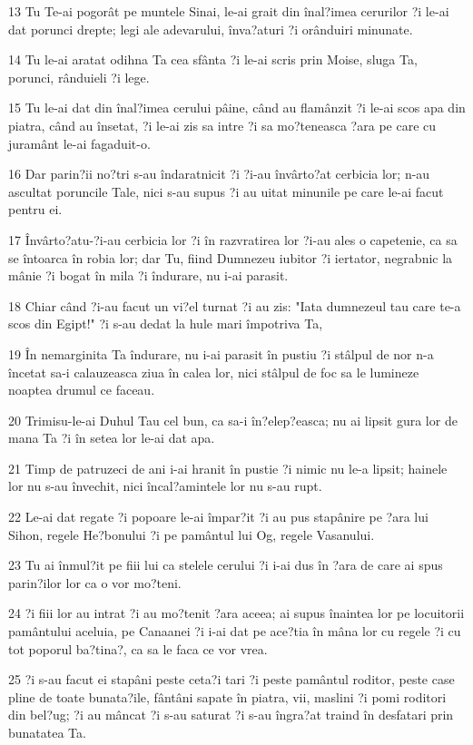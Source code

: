 \par 13 Tu Te-ai pogorât pe muntele Sinai, le-ai grait din înal?imea cerurilor ?i le-ai dat porunci drepte; legi ale adevarului, înva?aturi ?i orânduiri minunate.
\par 14 Tu le-ai aratat odihna Ta cea sfânta ?i le-ai scris prin Moise, sluga Ta, porunci, rânduieli ?i lege.
\par 15 Tu le-ai dat din înal?imea cerului pâine, când au flamânzit ?i le-ai scos apa din piatra, când au însetat, ?i le-ai zis sa intre ?i sa mo?teneasca ?ara pe care cu juramânt le-ai fagaduit-o.
\par 16 Dar parin?ii no?tri s-au îndaratnicit ?i ?i-au învârto?at cerbicia lor; n-au ascultat poruncile Tale, nici s-au supus ?i au uitat minunile pe care le-ai facut pentru ei.
\par 17 Învârto?atu-?i-au cerbicia lor ?i în razvratirea lor ?i-au ales o capetenie, ca sa se întoarca în robia lor; dar Tu, fiind Dumnezeu iubitor ?i iertator, negrabnic la mânie ?i bogat în mila ?i îndurare, nu i-ai parasit.
\par 18 Chiar când ?i-au facut un vi?el turnat ?i au zis: "Iata dumnezeul tau care te-a scos din Egipt!" ?i s-au dedat la hule mari împotriva Ta,
\par 19 În nemarginita Ta îndurare, nu i-ai parasit în pustiu ?i stâlpul de nor n-a încetat sa-i calauzeasca ziua în calea lor, nici stâlpul de foc sa le lumineze noaptea drumul ce faceau.
\par 20 Trimisu-le-ai Duhul Tau cel bun, ca sa-i în?elep?easca; nu ai lipsit gura lor de mana Ta ?i în setea lor le-ai dat apa.
\par 21 Timp de patruzeci de ani i-ai hranit în pustie ?i nimic nu le-a lipsit; hainele lor nu s-au învechit, nici încal?amintele lor nu s-au rupt.
\par 22 Le-ai dat regate ?i popoare le-ai împar?it ?i au pus stapânire pe ?ara lui Sihon, regele He?bonului ?i pe pamântul lui Og, regele Vasanului.
\par 23 Tu ai înmul?it pe fiii lui ca stelele cerului ?i i-ai dus în ?ara de care ai spus parin?ilor lor ca o vor mo?teni.
\par 24 ?i fiii lor au intrat ?i au mo?tenit ?ara aceea; ai supus înaintea lor pe locuitorii pamântului aceluia, pe Canaanei ?i i-ai dat pe ace?tia în mâna lor cu regele ?i cu tot poporul ba?tina?, ca sa le faca ce vor vrea.
\par 25 ?i s-au facut ei stapâni peste ceta?i tari ?i peste pamântul roditor, peste case pline de toate bunata?ile, fântâni sapate în piatra, vii, maslini ?i pomi roditori din bel?ug; ?i au mâncat ?i s-au saturat ?i s-au îngra?at traind în desfatari prin bunatatea Ta.
